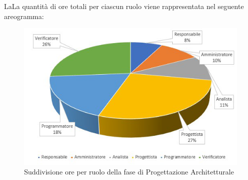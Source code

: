 LaLa quantità di ore totali per ciascun ruolo viene rappresentata nel seguente areogramma:
\begin{figure}[h!]
	\centering
	\includegraphics{Sezioni/Aerogrammi/AerogrammaProgettArchitetturale.png}
	\caption{Suddivisione ore per ruolo della fase di Progettazione Architetturale}
\end{figure}